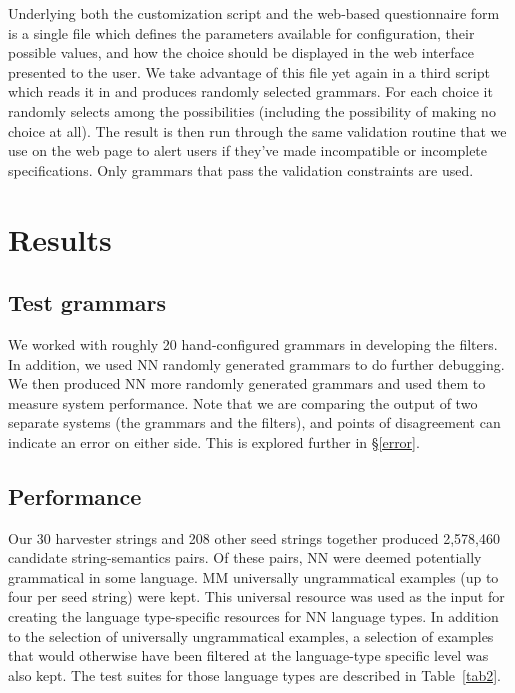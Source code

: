 \documentclass[11pt]{article}
\begin{document}
Underlying both the customization script and the web-based
questionnaire form is a single file which defines the parameters
available for configuration, their possible values, and how the choice
should be displayed in the web interface presented to the user. We
take advantage of this file yet again in a third script which reads it
in and produces randomly selected grammars.  For each choice it randomly
selects among the possibilities (including the possibility of making
no choice at all).  The result is then run through the same validation
routine that we use on the web page to alert users if they've made
incompatible or incomplete specifications.  Only grammars that pass
the validation constraints are used.

\section{Results}

\subsection{Test grammars}

We worked with roughly 20 hand-configured grammars in developing the
filters.  In addition, we used NN randomly generated grammars 
to do further debugging.  We then produced NN more randomly
generated grammars and used them to measure system performance. Note
that we are comparing the output of two separate systems (the grammars
and the filters), and points of disagreement can indicate an error
on either side.  This is explored further in \S\ref{error}.

\subsection{Performance}


Our 30 harvester strings and 208 other seed strings together produced
2,578,460 candidate string-semantics pairs.  Of these pairs, NN were deemed
potentially grammatical in some language.  MM universally
ungrammatical examples (up to four per seed string) were kept.  This
universal resource was used as the input for creating the language
type-specific resources for NN language types.  In addition to the
selection of universally ungrammatical examples, a selection of
examples that would otherwise have been filtered at the language-type
specific level was also kept.  The test suites for those language
types are described in Table~\ref{tab2}.
\end{document}
